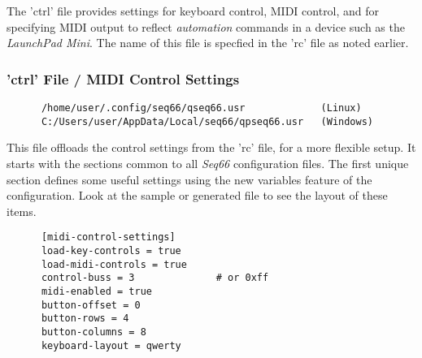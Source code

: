    The 'ctrl' file provides settings for keyboard control, MIDI control, and
   for specifying MIDI output to reflect \textsl{automation} commands in a
   device such as the \textsl{LaunchPad Mini}.  The name of this file is
   specfied in the 'rc' file as noted earlier.

\subsubsection{'ctrl' File / MIDI Control Settings}
\label{subsubsec:configuration_ctrl_midi_control_settings}

   \begin{verbatim}
      /home/user/.config/seq66/qseq66.usr             (Linux)
      C:/Users/user/AppData/Local/seq66/qpseq66.usr   (Windows)
   \end{verbatim}

   This file offloads the control settings from the 'rc' file, for a more
   flexible setup. It starts with the sections common to all \textsl{Seq66}
   configuration files.  The first unique section defines some useful settings
   using the new variables feature of the configuration.  Look at the sample or
   generated file to see the layout of these items.

	\begin{verbatim}
      [midi-control-settings]
      load-key-controls = true
      load-midi-controls = true
      control-buss = 3              # or 0xff
      midi-enabled = true
      button-offset = 0
      button-rows = 4
      button-columns = 8
      keyboard-layout = qwerty
	\end{verbatim}

